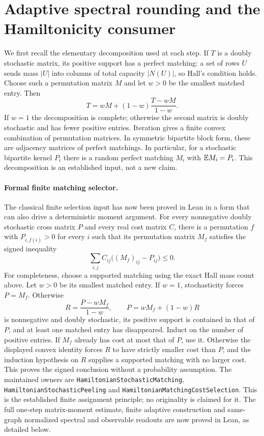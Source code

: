 \section{Adaptive spectral rounding and the Hamiltonicity consumer}
\label{sec:rounding}
We first recall the elementary decomposition used at each step.
If \(T\) is a doubly stochastic matrix, its positive support has
a perfect matching: a set of rows \(U\) sends mass \(|U|\)
into columns of total capacity \(|N(U)|\), so Hall's condition holds.
Choose such a permutation matrix \(M\) and let \(w>0\) be the
smallest matched entry.
Then
\[
 T=wM+(1-w)\frac{T-wM}{1-w}.
\]
If \(w=1\) the decomposition is complete; otherwise the second
matrix is doubly stochastic and has fewer positive entries.
Iteration gives a finite convex combination of permutation
matrices. In symmetric bipartite block form, these are adjacency
matrices of perfect matchings. In particular, for a stochastic
bipartite kernel \(P_i\) there is a random perfect matching \(M_i\)
with \(\mathbb E M_i=P_i\). This decomposition is an established input,
not a new claim.

\paragraph{Formal finite matching selector.}
The classical finite selection input has now been proved in Lean in
a form that can also drive a deterministic moment argument.
For every nonnegative doubly stochastic cross matrix \(P\) and
every real cost matrix \(C\), there is a permutation \(f\) with
\(P_{i,f(i)}>0\) for every \(i\) such that its permutation matrix
\(M_f\) satisfies the signed inequality
\[
 \sum_{i,j} C_{ij}\bigl((M_f)_{ij}-P_{ij}\bigr)\leq0.
\]
For completeness, choose a supported matching using the exact Hall
mass count above.  Let \(w>0\) be its smallest matched entry.
If \(w=1\), stochasticity forces \(P=M_f\).
Otherwise
\[
 R=\frac{P-wM_f}{1-w},\qquad P=wM_f+(1-w)R
\]
is nonnegative and doubly stochastic, its positive support is contained
in that of \(P\), and at least one matched entry has disappeared.
Induct on the number of positive entries.
If \(M_f\) already has cost at most that of \(P\), use it.
Otherwise the displayed convex identity forces \(R\) to have
strictly smaller cost than \(P\), and the induction hypothesis on
\(R\) supplies a supported matching with no larger cost.
This proves the signed conclusion without a probability assumption.
The maintained owners are \texttt{HamiltonianStochasticMatching},
\texttt{HamiltonianStochasticPeeling} and
\texttt{HamiltonianMatchingCostSelection}.
This is the established finite assignment principle; no originality
is claimed for it.  The full one-step matrix-moment estimate, finite adaptive
construction and same-graph normalized spectral and observable
readouts are now proved in Lean, as detailed below.

